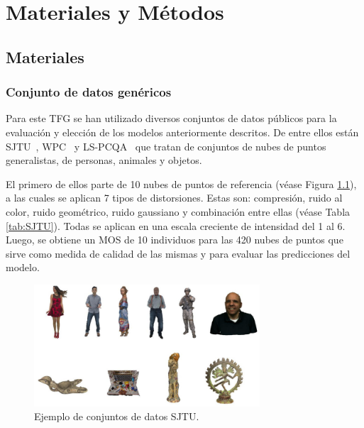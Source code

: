 \chapter{Materiales y Métodos}
\section{Materiales}
\subsection{Conjunto de datos genéricos} 
\label{sec:DatosPublicos}
Para este TFG se han utilizado diversos conjuntos de datos públicos para la 
evaluación y elección de los modelos anteriormente descritos. De entre ellos 
están SJTU~\cite{SJTU}, WPC~\cite{WPC1,WPC2} y LS-PCQA~\cite{ResSCNN} que tratan 
de conjuntos de nubes de puntos generalistas, de personas, animales y objetos.

El primero de ellos parte de 10 nubes de puntos de referencia (véase Figura \ref{fig:SJTU}), 
a las cuales se aplican 7 tipos de distorsiones. Estas son: compresión, ruido 
al color, ruido geométrico, ruido gaussiano y combinación entre ellas (véase Tabla \ref{tab:SJTU}). Todas se aplican en una escala creciente
de intensidad del 1 al 6. Luego, se obtiene un MOS de 10 individuos para las 420 
nubes de puntos que sirve como medida de calidad de las mismas y para evaluar las predicciones del modelo.

\begin{figure}[htp]
  \centering 
    \includegraphics[width=0.75\textwidth]{imagenes/chapter4/SJTU}
    \caption{Ejemplo de conjuntos de datos SJTU.}
    \label{fig:SJTU}
\end{figure}

